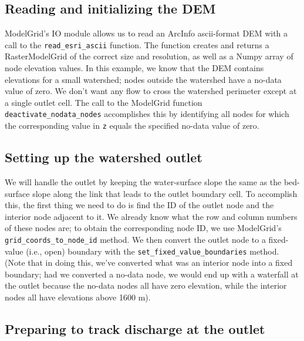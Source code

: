 \documentclass[12pt]{article}
\newcommand{\code}[1]{{\tt #1}}
\begin{document}
\subsection{Reading and initializing the DEM}



ModelGrid's IO module allows us to read an ArcInfo ascii-format DEM with a call to the \code{read\_esri\_ascii} function. The function creates and returns a RasterModelGrid of the correct size and resolution, as well as a Numpy array of node elevation values. In this example, we know that the DEM contains elevations for a small watershed; nodes outside the watershed have a no-data value of zero. We don't want any flow to cross the watershed perimeter except at a single outlet cell. The call to the ModelGrid function \code{deactivate\_nodata\_nodes} accomplishes this by identifying all nodes for which the corresponding value in \code{z} equals the specified no-data value of zero.

\subsection{Setting up the watershed outlet}



We will handle the outlet by keeping the water-surface slope the same as the bed-surface slope along the link that leads to the outlet boundary cell. To accomplish this, the first thing we need to do is find the ID of the outlet node and the interior node adjacent to it. We already know what the row and column numbers of these nodes are; to obtain the corresponding node ID, we use ModelGrid's \code{grid\_coords\_to\_node\_id} method. We then convert the outlet node to a fixed-value (i.e., open) boundary with the \code{set\_fixed\_value\_boundaries} method. (Note that in doing this, we've converted what was an interior node into a fixed boundary; had we converted a no-data node, we would end up with a waterfall at the outlet because the no-data nodes all have zero elevation, while the interior nodes all have elevations above 1600 m).

\subsection{Preparing to track discharge at the outlet}
\end{document}
